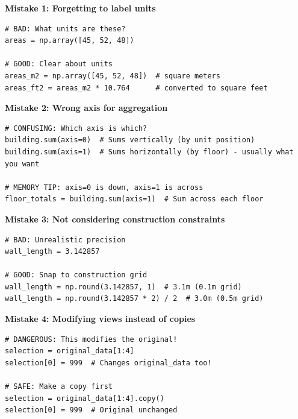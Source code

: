 \begin{tcolorbox}[
    title=Avoid These Common Pitfalls,
    colframe=purple,
    colback = white,
    arc=2mm
]
\textbf{Mistake 1: Forgetting to label units}
\begin{lstlisting}[basicstyle=\ttfamily\footnotesize,breaklines=true,columns=fullflexible,keepspaces=true,xleftmargin=0pt]
# BAD: What units are these?
areas = np.array([45, 52, 48])

# GOOD: Clear about units
areas_m2 = np.array([45, 52, 48])  # square meters
areas_ft2 = areas_m2 * 10.764      # converted to square feet

\end{lstlisting}

\textbf{Mistake 2: Wrong axis for aggregation}
\begin{lstlisting}[basicstyle=\ttfamily\footnotesize,breaklines=true,columns=fullflexible,keepspaces=true,xleftmargin=0pt]
# CONFUSING: Which axis is which?
building.sum(axis=0)  # Sums vertically (by unit position)
building.sum(axis=1)  # Sums horizontally (by floor) - usually what you want

# MEMORY TIP: axis=0 is down, axis=1 is across
floor_totals = building.sum(axis=1)  # Sum across each floor

\end{lstlisting}

\textbf{Mistake 3: Not considering construction constraints}
\begin{lstlisting}[basicstyle=\ttfamily\footnotesize,breaklines=true,columns=fullflexible,keepspaces=true,xleftmargin=0pt]
# BAD: Unrealistic precision
wall_length = 3.142857 

# GOOD: Snap to construction grid
wall_length = np.round(3.142857, 1)  # 3.1m (0.1m grid)
wall_length = np.round(3.142857 * 2) / 2  # 3.0m (0.5m grid)

\end{lstlisting}

\textbf{Mistake 4: Modifying views instead of copies}
\begin{lstlisting}[basicstyle=\ttfamily\footnotesize,breaklines=true,columns=fullflexible,keepspaces=true,xleftmargin=0pt]
# DANGEROUS: This modifies the original!
selection = original_data[1:4]
selection[0] = 999  # Changes original_data too!

# SAFE: Make a copy first
selection = original_data[1:4].copy()
selection[0] = 999  # Original unchanged

\end{lstlisting}
\end{tcolorbox}

